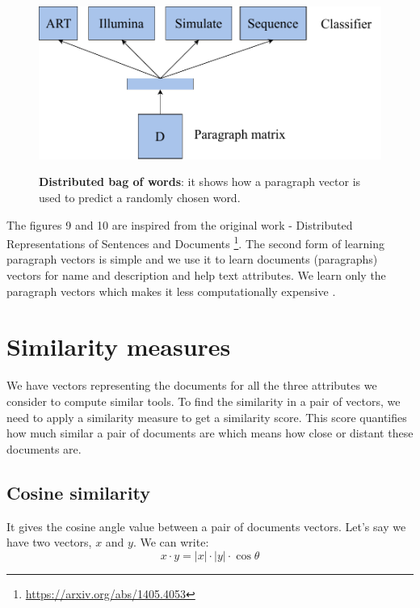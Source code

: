 \begin{figure}[h]
\begin{centering}
    {\includegraphics[scale=0.7]{figures/dbow_pv.pdf}}
    \caption[Distributed bag of words]{\textbf{Distributed bag of words}: it shows how a paragraph vector is used to predict a randomly chosen word.}
\end{centering}
\end{figure}

The figures 9 and 10 are inspired from the original work - Distributed Representations of Sentences and Documents \footnote{\label{pv}\url{https://arxiv.org/abs/1405.4053}}.
The second form of learning paragraph vectors is simple and we use it to learn documents (paragraphs) vectors for name and description and help text attributes. We learn only the paragraph vectors which makes it less computationally expensive \cite{DBLP:journals/corr/LeM14}.

\section{Similarity measures}
We have vectors representing the documents for all the three attributes we consider to compute similar tools. To find the similarity in a pair of vectors, we need to apply a similarity measure to get a similarity score. This score quantifies how much similar a pair of documents are which means how close or distant these documents are.

\subsection{Cosine similarity}
It gives the cosine angle value between a pair of documents vectors. Let's say we have two vectors, $x$ and $y$. We can write:
\begin{equation}
x \cdot y = |x| \cdot |y| \cdot \cos{\theta}
\end{equation}

